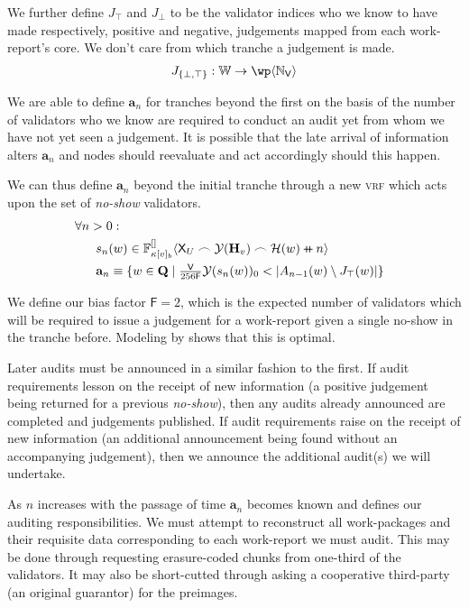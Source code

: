 We further define $J_\top$ and $J_\bot$ to be the validator indices who we know to have made respectively, positive and negative, judgements mapped from each work-report's core. We don't care from which tranche a judgement is made.
\begin{align}
  J_{\{\bot, \top\}}: \mathbb{W} \to \powset{\N_\mathsf{V}}
\end{align}

We are able to define $\mathbf{a}_n$ for tranches beyond the first on the basis of the number of validators who we know are required to conduct an audit yet from whom we have not yet seen a judgement. It is possible that the late arrival of information alters $\mathbf{a}_n$ and nodes should reevaluate and act accordingly should this happen.

We can thus define $\mathbf{a}_n$ beyond the initial tranche through a new \textsc{vrf} which acts upon the set of \emph{no-show} validators.
\begin{align}
  \nonumber&\!\!\!\!\!\!\!\!\forall n > 0:\\
  &\ s_n(w) \in \bandersig{\kappa[v]_b}{\mathsf{X}_U \concat \banderout{\mathbf{H}_v}\concat\mathcal{H}(w)\doubleplus n}{[]} \\
  &\ \mathbf{a}_n \equiv \{ w \in \mathbf{Q} \mid \textstyle\frac{\mathsf{V}}{256\mathsf{F}}\banderout{s_n(w)}_0 < |A_{n - 1}(w) \setminus J_\top(w)| \}\!\!\!\!
\end{align}

We define our bias factor $\mathsf{F} = 2$, which is the expected number of validators which will be required to issue a judgement for a work-report given a single no-show in the tranche before. Modeling by \cite{cryptoeprint:2024/961} shows that this is optimal.

Later audits must be announced in a similar fashion to the first. If audit requirements lesson on the receipt of new information (\ie a positive judgement being returned for a previous \emph{no-show}), then any audits already announced are completed and judgements published. If audit requirements raise on the receipt of new information (\ie an additional announcement being found without an accompanying judgement), then we announce the additional audit(s) we will undertake.

As $n$ increases with the passage of time $\mathbf{a}_n$ becomes known and defines our auditing responsibilities. We must attempt to reconstruct all work-packages and their requisite data corresponding to each work-report we must audit. This may be done through requesting erasure-coded chunks from one-third of the validators. It may also be short-cutted through asking a cooperative third-party (\eg an original guarantor) for the preimages.

